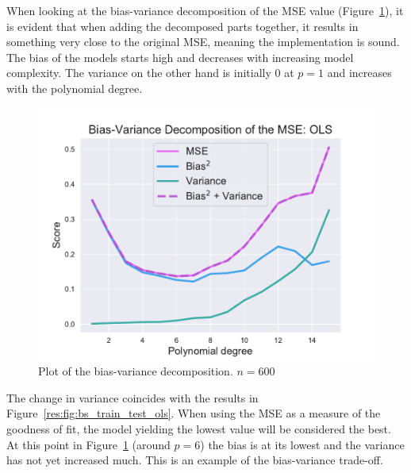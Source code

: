 \documentclass[twocolumn,english,notitlepage]{article}
\begin{document}
            When looking at the bias-variance decomposition of the MSE value (Figure~\ref{res:fig:bs_OLS_bias_variance_tradeoff_ols}), it is evident that when adding the decomposed parts together, it results in something very close to the original MSE, meaning the implementation is sound. The bias of the models starts high and decreases with increasing model complexity. The variance on the other hand is initially $0$ at $p=1$ and increases with the polynomial degree. 
            \begin{figure}[ht]
                \centering
                \includegraphics[width=\linewidth]{BS_Bias_var_decomp_OLS.pdf}
                \caption{Plot of the bias-variance decomposition. $n=600$ }
                \label{res:fig:bs_OLS_bias_variance_tradeoff_ols}
            \end{figure}

            The change in variance coincides with the results in Figure~\ref{res:fig:bs_train_test_ols}.
            When using the MSE as a measure of the goodness of fit, the model yielding the lowest value will be considered the best. At this point in Figure~\ref{res:fig:bs_OLS_bias_variance_tradeoff_ols} (around $p=6$) the bias is at its lowest and the variance has not yet increased much. This is an example of the bias-variance trade-off.  
\end{document}
